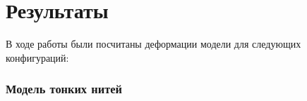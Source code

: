 \chapter{Результаты}\label{ch:results}
В ходе работы были посчитаны деформации модели для следующих конфигураций:

\subsection*{Модель тонких нитей}
